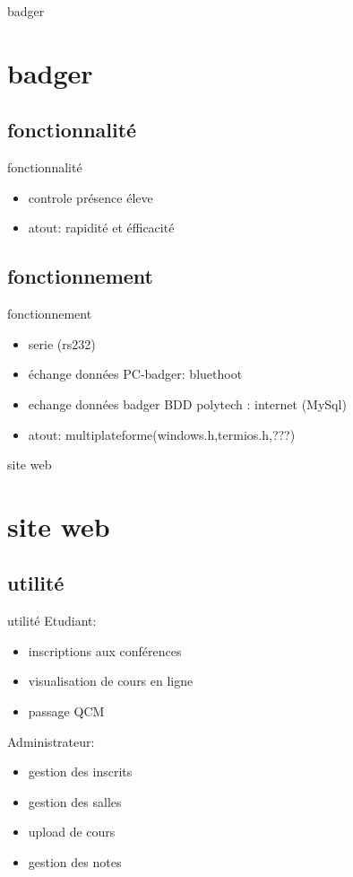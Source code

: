 \documentclass{beamer}
\begin{document}
\begin{frame}{badger}
 \section{badger}
  \subsection{fonctionnalité}
	\begin{block}{fonctionnalité}
		\begin{itemize}
			\item controle présence éleve
			\item atout: rapidité et éfficacité
		\end{itemize}
	\end{block}

 \subsection{fonctionnement}
	\begin{block}{fonctionnement}
		\begin{itemize}
			\item serie (rs232)
			\item échange données PC-badger: bluethoot
			\item echange données badger BDD polytech : internet (MySql)
			\item atout: multiplateforme(windows.h,termios.h,???)
		\end{itemize}
	\end{block}

\end{frame}

\begin{frame}{site web}
 \section{site web}
  \subsection{utilité}
	\begin{block}{utilité}
		Etudiant:
		\begin{itemize}
			\item inscriptions aux conférences
			\item visualisation de cours en ligne
			\item passage QCM
		\end{itemize}
		Administrateur:		
		\begin{itemize}
			\item gestion des inscrits
			\item gestion des salles
			\item upload de cours
			\item gestion des notes
		\end{itemize}
	\end{block}
			
\end{frame}
\end{document}
